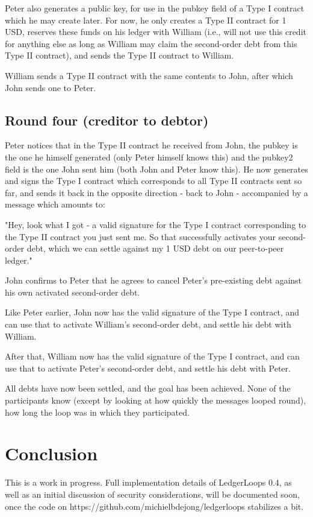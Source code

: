 \documentclass[11pt,twoside,a4paper]{article}
\begin{document}
Peter also generates a public key, for use in the pubkey field of a Type I contract which he may create later. For now,
he only creates a Type II contract for 1 USD, reserves these funds on his ledger with William (i.e., will not use this credit
for anything else as long as William may claim the second-order debt from this Type II contract), and sends the Type II
contract to William.

William sends a Type II contract with the same contents to John, after which John sends one to Peter.

\subsection{Round four (creditor to debtor)}

Peter notices that in the Type II contract he received from John, the pubkey is the one he himself generated (only Peter himself
knows this) and the pubkey2 field is the one John sent him (both John and Peter know this). He now generates and signs
the Type I contract which corresponds to all Type II contracts sent so far, and sends it back in the opposite direction -
back to John - accompanied by a message which amounts to:

"Hey, look what I got - a valid signature for the Type I contract corresponding to the Type II contract you just sent me.
So that successfully activates your second-order debt, which we can settle against my 1 USD debt on our peer-to-peer ledger."

John confirms to Peter that he agrees to cancel Peter's pre-existing debt against his own activated second-order debt.

Like Peter earlier, John now has the valid signature of the Type I contract, and can use that to activate William's second-order
debt, and settle his debt with William.

After that, William now has the valid signature of the Type I contract, and can use that to activate Peter's second-order
debt, and settle his debt with Peter.

All debts have now been settled, and the goal has been achieved. None of the participants know (except by looking at how
quickly the messages looped round), how long the loop was in which they participated.

\section{Conclusion}
This is a work in progress. Full implementation details of LedgerLoops 0.4, as well as an initial discussion of security considerations,
will be documented soon, once the code on
https://github.com/michielbdejong/ledgerloops stabilizes a bit.
\end{document}
